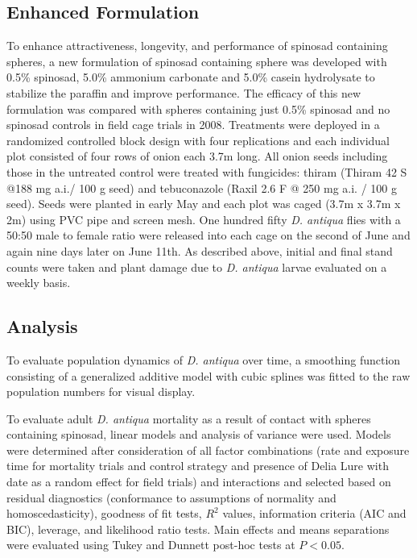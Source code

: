 \documentclass[alpha-refs]{wiley-article}
\begin{document}
\subsection{Enhanced Formulation}

To enhance attractiveness, longevity, and performance of spinosad containing spheres, a new formulation of spinosad containing sphere was developed with 0.5\% spinosad, 5.0\% ammonium carbonate and 5.0\% casein hydrolysate to stabilize the paraffin and improve performance. The efficacy of this new formulation was compared with spheres containing just 0.5\% spinosad and no spinosad controls in field cage trials in 2008. Treatments were deployed in a randomized controlled block design with four replications and each individual plot consisted of four rows of onion each 3.7m long. All onion seeds including those in the untreated control were treated with fungicides: thiram (Thiram 42 S {@}188 mg a.i./ 100 g seed) and tebuconazole (Raxil 2.6 F @ 250 mg a.i. / 100 g seed). Seeds were planted in early May and each plot was caged (3.7m x 3.7m x 2m) using PVC pipe and screen mesh. One hundred fifty \textit{D. antiqua} flies with a 50:50 male to female ratio were released into each cage on the second of June and again nine days later on June 11th. As described above, initial and final stand counts were taken and plant damage due to \textit{D. antiqua} larvae evaluated on a weekly basis.  


\subsection{Analysis}

To evaluate population dynamics of \textit{D. antiqua} over time, a smoothing function consisting of a generalized additive model with cubic splines was fitted to the raw population numbers for visual display.  

To evaluate adult \textit{D. antiqua} mortality as a result of contact with spheres containing spinosad, linear models and analysis of variance were used.  Models were determined after consideration of all factor combinations (rate and exposure time for mortality trials and control strategy and presence of Delia Lure with date as a random effect for field trials) and interactions and selected based on residual diagnostics (conformance to assumptions of normality and homoscedasticity), goodness of fit tests, $R^2$ values, information criteria (AIC and BIC), leverage, and likelihood ratio tests. Main effects and means separations were evaluated using Tukey and Dunnett post-hoc tests at $P < 0.05$.  
\end{document}
